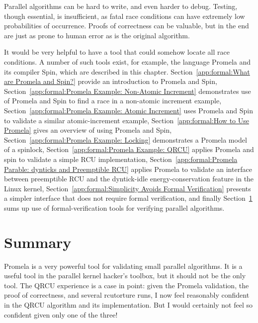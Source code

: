 


Parallel algorithms can be hard to write, and even harder to debug.
Testing, though essential, is insufficient, as fatal race conditions
can have extremely low probabilities of occurrence.
Proofs of correctness can be valuable, but in the end are just as
prone to human error as is the original algorithm.

It would be very helpful to have a tool that could somehow locate
all race conditions.
A number of such tools exist, for example,
the language Promela and its compiler Spin, which are described in
this chapter.
Section~\ref{app:formal:What are Promela and Spin?} provide an
introduction to Promela and Spin,
Section~\ref{app:formal:Promela Example: Non-Atomic Increment}
demonstrates use of Promela and Spin to find a race in a non-atomic increment
example,
Section~\ref{app:formal:Promela Example: Atomic Increment}
uses Promela and Spin to validate a similar atomic-increment example,
Section~\ref{app:formal:How to Use Promela}
gives an overview of using Promela and Spin,
Section~\ref{app:formal:Promela Example: Locking}
demonstrates a Promela model of a spinlock,
Section~\ref{app:formal:Promela Example: QRCU}
applies Promela and spin to validate a simple RCU implementation,
Section~\ref{app:formal:Promela Parable: dynticks and Preemptible RCU}
applies Promela to validate an interface between preemptible RCU and
the dyntick-idle energy-conservation feature in the Linux kernel,
Section~\ref{app:formal:Simplicity Avoids Formal Verification}
presents a simpler interface that does not require formal verification,
and finally
Section~\ref{app:formal:Summary}
sums up use of formal-verification tools for verifying parallel algorithms.




\section{Summary}
\label{app:formal:Summary}

Promela is a very powerful tool for validating small parallel algorithms.
It is a useful tool in the parallel kernel hacker's toolbox, but
it should not be the only tool.
The QRCU experience is a case in point: given the Promela validation,
the proof of correctness, and several
rcutorture
runs, I now feel
reasonably confident in the QRCU algorithm and its implementation.
But I would certainly not feel so confident given only one of the three!


